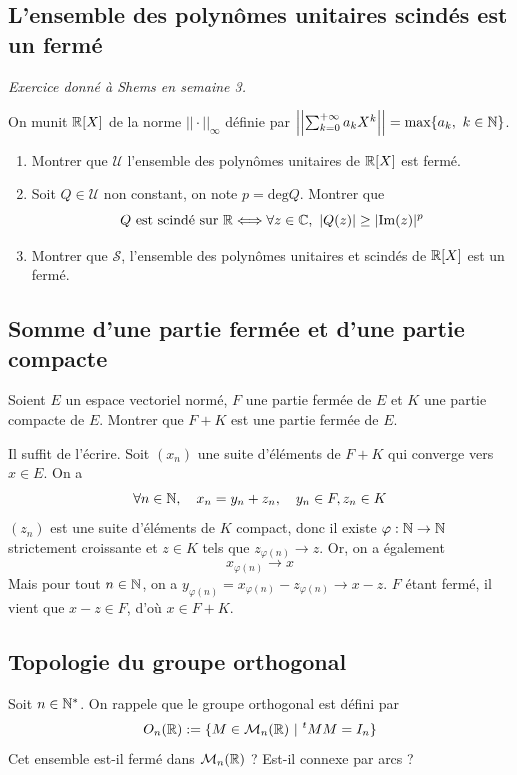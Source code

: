 \subsection{L'ensemble des polynômes unitaires scindés est un fermé}
\textit{Exercice donné à Shems en semaine 3.}
\begin{exo}
On munit $\mathbb{R}[X]$ de la norme $||\cdot||_{\infty}$ définie par $\left|\left|\sum_{k=0}^{+\infty}a_kX^k\right|\right|=\text{max}\lbrace a_k,\ k\in\mathbb{N}\rbrace$.
\begin{enumerate}
	\item Montrer que $\mathcal U$ l'ensemble des polynômes unitaires de $\mathbb{R}[X]$ est fermé.
	\item Soit $Q\in\mathcal U$ non constant, on note $p=\text{deg}Q$. Montrer que 
	\[Q\text{ est scindé sur }\mathbb{R}\Longleftrightarrow \forall z\in\mathbb{C},\ |Q(z)|\geq |\text{Im}(z)|^p\]
	\item Montrer que $\mathcal S$, l'ensemble des polynômes unitaires et scindés de $\mathbb{R}[X]$ est un fermé.
\end{enumerate}
\end{exo}


\begin{sol}
[À rédiger]
\end{sol}

\subsection{Somme d'une partie fermée et d'une partie compacte}
\begin{exo}
	Soient $E$ un espace vectoriel normé, $F$ une partie fermée de $E$ et $K$ une partie compacte de $E$. Montrer que $F+K$ est une partie fermée de $E$.
\end{exo}

\begin{sol}
	Il suffit de l'écrire. Soit $(x_n)$ une suite d'éléments de $F+K$ qui converge vers $x\in E$. On a \[\forall n\in\mathbb{N},\quad x_n=y_n+z_n,\quad y_n\in F,z_n\in K\]
	$(z_n)$ est une suite d'éléments de $K$ compact, donc il existe $\varphi :\mathbb{N}\to \mathbb{N}$ strictement croissante et $z\in K$ tels que $z_{\varphi(n)}\longrightarrow z$. Or, on a également \[x_{\varphi(n)}\longrightarrow x\]
	Mais pour tout $n\in\mathbb{N}$, on a $y_{\varphi(n)}=x_{\varphi(n)}-z_{\varphi(n)}\longrightarrow x-z$. $F$ étant fermé, il vient que $x-z\in F$, d'où $x\in F+K$.
\end{sol}

\subsection{Topologie du groupe orthogonal}
\begin{exo}
	Soit $n\in\mathbb{N}^*$. On rappele que le groupe orthogonal est défini par \[O_n(\R):=\lbrace M\in\mathcal M_n(\R)\ |\ {}^tMM=I_n\rbrace\]
	Cet ensemble est-il fermé dans $\mathcal M_n(\mathbb{R})$ ? Est-il connexe par arcs ?
\end{exo}

